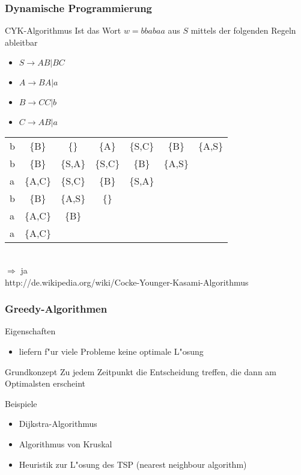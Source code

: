 \documentclass{beamer}
\begin{document}
\begin{frame}
\frametitle{Dynamische Programmierung}
\begin{exampleblock}{CYK-Algorithmus}
Ist das Wort $w = bbabaa$ aus $S$ mittels der folgenden Regeln ableitbar
\begin{itemize}
\item $S \rightarrow AB | BC$
\item $A \rightarrow BA | a$
\item $B \rightarrow CC | b$
\item $C \rightarrow AB | a$
\end{itemize}

\begin{tabular}{l|c|c|c|c|c|c}
b & \{B\} & \{\} & \{A\} & \{S,C\} & \{B\} & \{A,\alert{S}\}\\
b & \{B\} & \{S,A\} & \{S,C\} & \{B\} & \{A,S\}\\
a & \{A,C\} & \{S,C\} & \{B\} & \{S,A\}\\
b & \{B\} & \{A,S\} & \{\}\\
a & \{A,C\} & \{B\}\\
a & \{A,C\}
\end{tabular}\\
$\Longrightarrow$ ja\\
{\scriptsize http://de.wikipedia.org/wiki/Cocke-Younger-Kasami-Algorithmus}
\end{exampleblock}
\end{frame}


\begin{frame}
\frametitle{Greedy-Algorithmen}
\begin{block}{Eigenschaften}
\begin{itemize}
\item liefern f"ur viele Probleme keine optimale L"osung
\end{itemize}
\end{block}


\begin{alertblock}{Grundkonzept}
Zu jedem Zeitpunkt die Entscheidung treffen, die dann am Optimalsten erscheint
\end{alertblock}


\begin{exampleblock}{Beispiele}
\begin{itemize}
\item Dijkstra-Algorithmus
\item Algorithmus von Kruskal
\item Heuristik zur L"osung des TSP (nearest neighbour algorithm)
\end{itemize}
\end{exampleblock}
\end{frame}
\end{document}
